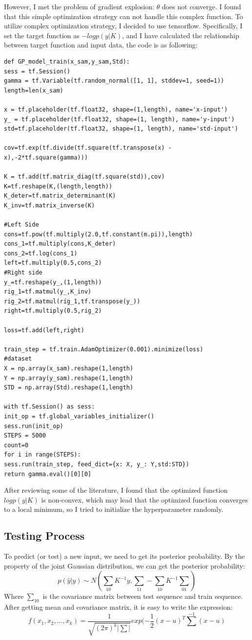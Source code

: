 \documentclass{article} %
\begin{document}
However, I met the problem of gradient explosion: $\theta$ does not converge. I found that this simple optimization strategy can not handle this complex function. To utilize complex optimization strategy, I decided to use tensorflow. Specifically, I set the target function as $-logp(y|K)$, and I have calculated the relationship between target function and input data, the code is as following:

\begin{lstlisting}
def GP_model_train(x_sam,y_sam,Std):
sess = tf.Session()
gamma = tf.Variable(tf.random_normal([1, 1], stddev=1, seed=1))
length=len(x_sam)

x = tf.placeholder(tf.float32, shape=(1,length), name='x-input')
y_ = tf.placeholder(tf.float32, shape=(1, length), name='y-input')
std=tf.placeholder(tf.float32, shape=(1, length), name='std-input')

cov=tf.exp(tf.divide(tf.square(tf.transpose(x) - x),-2*tf.square(gamma)))

K = tf.add(tf.matrix_diag(tf.square(std)),cov)
K=tf.reshape(K,(length,length))
K_deter=tf.matrix_determinant(K)
K_inv=tf.matrix_inverse(K)

#Left Side
cons=tf.pow(tf.multiply(2.0,tf.constant(m.pi)),length)             
cons_1=tf.multiply(cons,K_deter)
cons_2=tf.log(cons_1)
left=tf.multiply(0.5,cons_2)
#Right side
y_=tf.reshape(y_,(1,length))
rig_1=tf.matmul(y_,K_inv)
rig_2=tf.matmul(rig_1,tf.transpose(y_))
right=tf.multiply(0.5,rig_2)

loss=tf.add(left,right)

train_step = tf.train.AdamOptimizer(0.001).minimize(loss)
#dataset
X = np.array(x_sam).reshape(1,length)
Y = np.array(y_sam).reshape(1,length)
STD = np.array(Std).reshape(1,length)

with tf.Session() as sess:
init_op = tf.global_variables_initializer()
sess.run(init_op)
STEPS = 5000
count=0
for i in range(STEPS):
sess.run(train_step, feed_dict={x: X, y_: Y,std:STD})
return gamma.eval()[0][0]

\end{lstlisting}	
	 After reviewing some of the literature, I found that the optimized function $logp({y|K})$ is non-convex, which may lead that the optimized function converges to a local minimum, so I tried to initialize the hyperparameter randomly.
\subsection{Testing Process}
To predict (or test) a new input, we need to get its posterior probability. By the property of the joint Gaussian distribution, we can get the posterior probability:
\begin{equation}
p(\hat{y}|{y})\sim N(\sum_{10}K^{-1}y,\sum_{11}-\sum_{10}K^{-1}\sum_{01})
\end{equation}
Where $\sum_{10}$ is the covariance matrix between test sequence and train sequence. After getting mean and covariance matrix, it is easy to write the expression:
\begin{equation}
f(x_1,x_2,...,x_k)=\frac{1}{\sqrt{(2\pi)^k|\sum|}} exp(-\frac{1}{2}(x-u)^T\sum^{-1}(x-u)
\end{equation}
\end{document}
